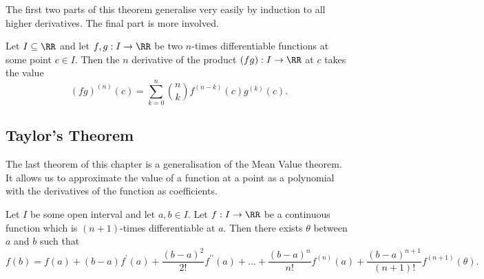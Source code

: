 \documentclass[../real_analysis.tex]{subfiles}
\begin{document}
            The first two parts of this theorem generalise very easily by induction to all higher derivatives. The final part is more involved.
            \begin{theorem}
                Let $I\subseteq\RR$ and let $f,g:I\to\RR$ be two $n$-times differentiable functions at some point $c\in I$. Then the $n$ derivative of the product $(fg):I\to\RR$ at $c$ takes the value
                \begin{equation}
                    (fg)^{(n)}(c)=\sum_{k=0}^n\binom{n}{k}f^{(n-k)}(c)g^{(k)}(c).
                \end{equation}
            \end{theorem}

        \subsection{Taylor's Theorem}\label{subsec:taylors-theorem}
            The last theorem of this chapter is a generalisation of the Mean Value theorem. It allows us to approximate the value of a function at a point as a polynomial with the derivatives of the function as coefficients.
            \begin{theorem}\label{thm:taylors-thm}
                Let $I$ be some open interval and let $a,b\in I$. Let $f:I\to\RR$ be a continuous function which is $(n+1)$-times differentiable at $a$. Then there exists $\theta$ between $a$ and $b$ such that
                \begin{equation}
                    f(b)=f(a)+(b-a)f^\prime(a)+\frac{(b-a)^2}{2!}f^{\prime\prime}(a)+\dots+\frac{(b-a)^n}{n!}f^{(n)}(a)+\frac{(b-a)^{n+1}}{(n+1)!}f^{(n+1)}(\theta).
                \end{equation}
            \end{theorem}
\end{document}
